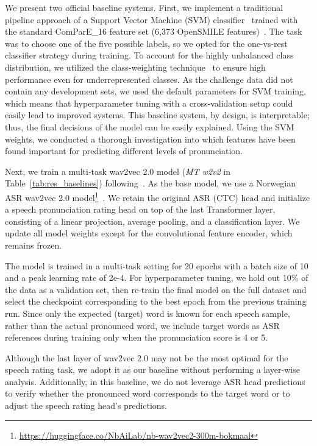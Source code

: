 \documentclass{article}
\begin{document}
We present two official baseline systems. First, we implement a traditional pipeline approach of a Support Vector Machine (SVM) classifier~\cite{fan-2008-linSVC} trained with the standard ComParE\_16 feature set (6,373 OpenSMILE features)~\cite{schuller16_interspeech}. The task was to choose one of the five possible labels, so we opted for the one-vs-rest classifier strategy during training. To account for the highly unbalanced class distribution, we utilized the class-weighting technique~\cite{king2001logistic} to ensure high performance even for underrepresented classes. As the challenge data did not contain any development sets, we used the default parameters for SVM training, which means that hyperparameter tuning with a cross-validation setup could easily lead to improved systems. This baseline system, by design, is interpretable; thus, the final decisions of the model can be easily explained. Using the SVM weights, we conducted a thorough investigation into which features have been found important for predicting different levels of pronunciation.

Next, we train a multi-task wav2vec 2.0 model (\textit{MT w2v2} in Table~\ref{tab:res_baselines}) following~\cite{getman23_slate}. As the base model, we use a Norwegian ASR wav2vec 2.0 model\footnote{\url{https://huggingface.co/NbAiLab/nb-wav2vec2-300m-bokmaal}}~\cite{de-la-rosa-etal-2023-boosting}. We retain the original ASR (CTC) head and initialize a speech pronunciation rating head on top of the last Transformer layer, consisting of a linear projection, average pooling, and a classification layer. We update all model weights except for the convolutional feature encoder, which remains frozen.

The model is trained in a multi-task setting for 20 epochs with a batch size of 10 and a peak learning rate of 2e-4. For hyperparameter tuning, we hold out 10\% of the data as a validation set, then re-train the final model on the full dataset and select the checkpoint corresponding to the best epoch from the previous training run. Since only the expected (target) word is known for each speech sample, rather than the actual pronounced word, we include target words as ASR references during training only when the pronunciation score is 4 or 5.

Although the last layer of wav2vec 2.0 may not be the most optimal for the speech rating task, we adopt it as our baseline without performing a layer-wise analysis. Additionally, in this baseline, we do not leverage ASR head predictions to verify whether the pronounced word corresponds to the target word or to adjust the speech rating head's predictions.
\end{document}

